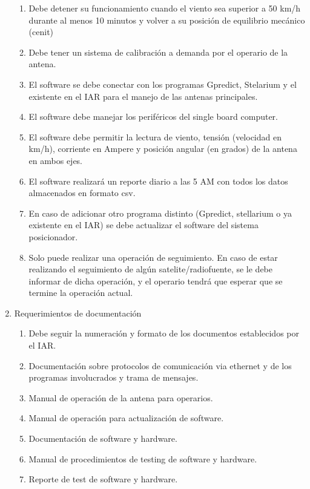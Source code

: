 \documentclass[11pt, %
codirector, %
]{charter}
\begin{document}
\begin{enumerate}
\begin{enumerate}
			\item Debe detener su funcionamiento cuando el viento sea superior a 50 km/h durante al menos 10 minutos y volver a su posición de equilibrio mecánico (cenit) 
			\item Debe tener un sistema de calibración a demanda por el operario de la antena. 
			\item El software se debe conectar con los programas Gpredict, Stelarium y el existente en el IAR para el manejo de las antenas principales. 
			\item El software debe manejar los periféricos del single board computer. 
			\item El software debe permitir la lectura de viento, tensión (velocidad en km/h), corriente en Ampere y posición angular (en grados) de la antena en ambos ejes. 
			\item El software realizará un reporte diario a las 5 AM con todos los datos almacenados en formato csv.  
			\item En caso de adicionar otro programa distinto (Gpredict, stellarium o ya existente en el IAR) se debe actualizar el software del sistema posicionador. 
			\item Solo puede realizar una operación de seguimiento. En caso de estar realizando el seguimiento de algún satelite/radiofuente, se le debe informar de dicha operación, y el operario tendrá que esperar que se termine la operación actual.  
		\end{enumerate}
	\item Requerimientos de documentación
		\begin{enumerate}
			\item Debe seguir la numeración y formato de los documentos establecidos por el IAR. 
			\item Documentación sobre protocolos de comunicación via ethernet y de los programas involucrados y trama de mensajes.
			\item Manual de operación de la antena para operarios. 
			\item Manual de operación para actualización de software. 
			\item Documentación de software y hardware. 
			\item Manual de procedimientos de testing de software y hardware.	
			\item Reporte de test de software y hardware. 

\end{enumerate}
\end{enumerate}
\end{document}
